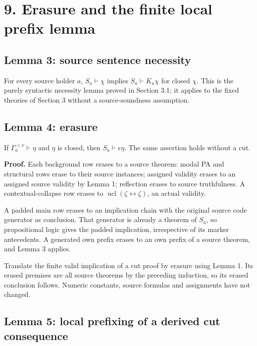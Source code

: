 \documentclass[
  11pt,
  letterpaper,
]{article}
\begin{document}
\section{9. Erasure and the finite local prefix
lemma}\label{erasure-and-the-finite-local-prefix-lemma}

\subsection{Lemma 3: source sentence
necessity}\label{lemma-3-source-sentence-necessity}

For every source holder \(a\), \(S_a\vdash\chi\) implies
\(S_a\vdash K_a\chi\) for closed \(\chi\). This is the purely syntactic
necessity lemma proved in Section 3.1; it applies to the fixed theories
of Section 3 without a source-soundness assumption.

\subsection{Lemma 4: erasure}\label{lemma-4-erasure}

If \(\Gamma_a^{<\nu}\vdash\eta\) and \(\eta\) is closed, then
\(S_a\vdash\epsilon\eta\). The same assertion holds without a cut.

\textbf{Proof.} Each background row erases to a source theorem: modal PA
and structural rows erase to their source instances; assigned validity
erases to an assigned source validity by Lemma 1; reflection erases to
source truthfulness. A contextual-collapse row erases to
\(\operatorname{ucl}(\zeta\leftrightarrow\zeta)\), an actual validity.

A padded main row erases to an implication chain with the original
source code generator as conclusion. That generator is already a theorem
of \(S_a\), so propositional logic gives the padded implication,
irrespective of its marker antecedents. A generated own prefix erases to
an own prefix of a source theorem, and Lemma 3 applies.

Translate the finite valid implication of a cut proof by erasure using
Lemma 1. Its erased premises are all source theorems by the preceding
induction, so its erased conclusion follows. Numeric constants, source
formulas and assignments have not changed.

\subsection{Lemma 5: local prefixing of a derived cut
consequence}\label{lemma-5-local-prefixing-of-a-derived-cut-consequence}
\end{document}
